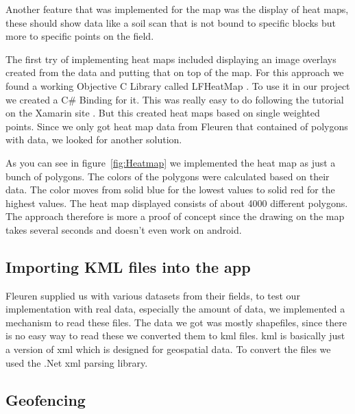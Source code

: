 Another feature that was implemented for the map was the display of heat maps, these should show data like a soil scan that is not bound to specific blocks but more to specific points on the field.

The first try of implementing heat maps included displaying an image \glspl{overlay} created from the data and putting that on top of the map. For this approach we found a working Objective C Library called LFHeatMap \citet{LFHeatMaps}. To use it in our project we created a C\# Binding for it.
This was really easy to do following the tutorial on the Xamarin site \citet{bindingtut}. But this created heat maps based on single weighted points. Since we only got heat map data from Fleuren that contained of polygons with data, we looked for another solution.

As you can see in figure~\ref{fig:Heatmap} we implemented the heat map as just a bunch of polygons. The colors of the polygons were calculated based on their data. The color moves from solid blue for the lowest values to solid red for the highest values. The heat map displayed consists of about 4000 different polygons. The approach therefore is more a proof of concept since the drawing on the map takes several seconds and doesn't even work on android.

\subsection{Importing KML files into the app}
Fleuren supplied us with various datasets from their fields, to test our implementation with real data, especially the amount of data, we implemented a mechanism to read these files. The data we got was mostly shapefiles, since there is no easy way to read these we converted them to 
\gls{kml} files. \gls{kml} is basically just a version of \gls{xml} which is designed for geospatial data. To convert the files we used the .Net xml parsing library. 

\subsection{Geofencing}

